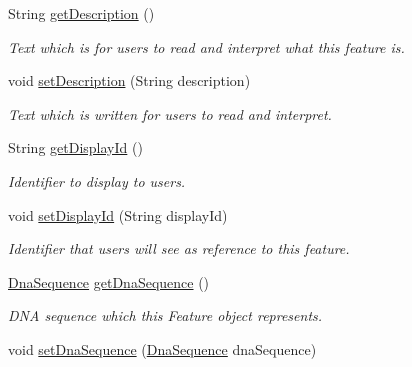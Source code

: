 \begin{DoxyCompactItemize}
\item 
String \hyperlink{classorg_1_1sbolstandard_1_1lib_s_b_o_lj_1_1_sequence_feature_acc578293c55c6e370320bbdccd61f197}{getDescription} ()
\begin{DoxyCompactList}\small\item\em Text which is for users to read and interpret what this feature is. \item\end{DoxyCompactList}\item 
void \hyperlink{classorg_1_1sbolstandard_1_1lib_s_b_o_lj_1_1_sequence_feature_a2c512fe7b7150f42cd0c9adceaadf63f}{setDescription} (String description)
\begin{DoxyCompactList}\small\item\em Text which is written for users to read and interpret. \item\end{DoxyCompactList}\item 
String \hyperlink{classorg_1_1sbolstandard_1_1lib_s_b_o_lj_1_1_sequence_feature_a20b5f8fbb51b1d3218571cd26143c8ec}{getDisplayId} ()
\begin{DoxyCompactList}\small\item\em Identifier to display to users. \item\end{DoxyCompactList}\item 
void \hyperlink{classorg_1_1sbolstandard_1_1lib_s_b_o_lj_1_1_sequence_feature_a965b4e95b4a3eea88406a0702a7948f2}{setDisplayId} (String displayId)
\begin{DoxyCompactList}\small\item\em Identifier that users will see as reference to this feature. \item\end{DoxyCompactList}\item 
\hyperlink{classorg_1_1sbolstandard_1_1lib_s_b_o_lj_1_1_dna_sequence}{DnaSequence} \hyperlink{classorg_1_1sbolstandard_1_1lib_s_b_o_lj_1_1_sequence_feature_a75889c84432582829189e4ef3f0014b0}{getDnaSequence} ()
\begin{DoxyCompactList}\small\item\em DNA sequence which this Feature object represents. \item\end{DoxyCompactList}\item 
void \hyperlink{classorg_1_1sbolstandard_1_1lib_s_b_o_lj_1_1_sequence_feature_a3ceac5c54d86a162d09597b1a540a1ba}{setDnaSequence} (\hyperlink{classorg_1_1sbolstandard_1_1lib_s_b_o_lj_1_1_dna_sequence}{DnaSequence} dnaSequence)

\end{DoxyCompactItemize}
